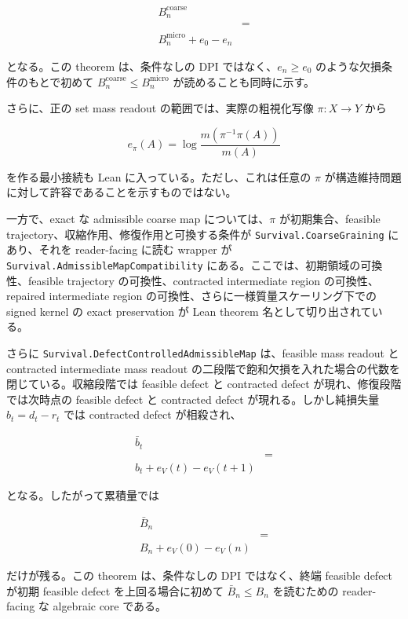\documentclass[12pt,a4paper]{article}
\begin{document}
\[
\begin{aligned}
B_{n}^{\mathrm{coarse}} \\
&= \\
B_{n}^{\mathrm{micro}}+e_0-e_{n}
\end{aligned}
\]

となる。この theorem は、条件なしの DPI ではなく、\(e_{n}\ge e_0\) のような欠損条件のもとで初めて \(B_{n}^{\mathrm{coarse}}\le B_{n}^{\mathrm{micro}}\) が読めることも同時に示す。

さらに、正の set mass readout の範囲では、実際の粗視化写像 \(\pi:X\to Y\) から

\[
e_\pi(A)=\log\frac{m(\pi^{-1}\pi(A))}{m(A)}
\]

を作る最小接続も Lean に入っている。ただし、これは任意の \(\pi\) が構造維持問題に対して許容であることを示すものではない。

一方で、exact な admissible coarse map については、\(\pi\) が初期集合、feasible trajectory、収縮作用、修復作用と可換する条件が \texttt{Survival.CoarseGraining} にあり、それを reader-facing に読む wrapper が \texttt{Survival.AdmissibleMapCompatibility} にある。ここでは、初期領域の可換性、feasible trajectory の可換性、contracted intermediate region の可換性、repaired intermediate region の可換性、さらに一様質量スケーリング下での signed kernel の exact preservation が Lean theorem 名として切り出されている。

さらに \texttt{Survival.DefectControlledAdmissibleMap} は、feasible mass readout と contracted intermediate mass readout の二段階で飽和欠損を入れた場合の代数を閉じている。収縮段階では feasible defect と contracted defect が現れ、修復段階では次時点の feasible defect と contracted defect が現れる。しかし純損失量 \(b_{t}=d_{t}-r_{t}\) では contracted defect が相殺され、

\[
\begin{aligned}
\bar b_{t} \\
&= \\
b_{t} + e_{V}(t)-e_{V}(t+1)
\end{aligned}
\]

となる。したがって累積量では

\[
\begin{aligned}
\bar B_{n} \\
&= \\
B_{n} + e_{V}(0)-e_{V}(n)
\end{aligned}
\]

だけが残る。この theorem は、条件なしの DPI ではなく、終端 feasible defect が初期 feasible defect を上回る場合に初めて \(\bar B_{n}\le B_{n}\) を読むための reader-facing な algebraic core である。
\end{document}
